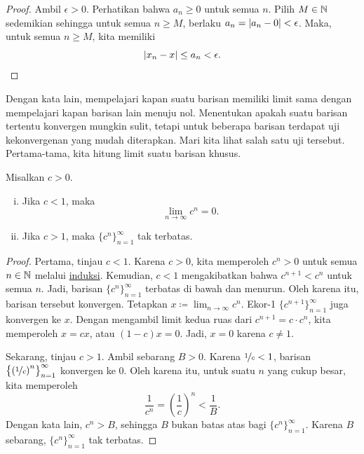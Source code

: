 \begin{proof}
Ambil $\epsilon > 0$.  Perhatikan bahwa $a_n \geq 0$
untuk semua $n$.  Pilih $M \in {\mathbb{N}}$ sedemikian sehingga untuk
semua $n \geq M$, berlaku
$a_n = \lvert {a_n - 0} \rvert < \epsilon$.  Maka, untuk semua $n \geq M$,
kita memiliki
\begin{equation*}
\lvert {x_n - x} \rvert \leq a_n < \epsilon . \qedhere
\end{equation*}
\end{proof}

Dengan kata lain, mempelajari kapan suatu barisan memiliki limit sama
dengan mempelajari kapan barisan lain menuju nol.
Menentukan apakah suatu barisan tertentu konvergen mungkin sulit, tetapi
untuk beberapa barisan terdapat uji kekonvergenan yang mudah diterapkan.
Mari kita lihat salah satu uji tersebut.
Pertama-tama, kita hitung limit suatu barisan khusus.

\begin{prop}
Misalkan $c > 0$.
\begin{enumerate}[(i)]
\item
Jika $c < 1$, maka
\begin{equation*}
\lim_{n\to\infty} c^n = 0.
\end{equation*}
\item
Jika $c > 1$, maka $\{ c^n \}_{n=1}^\infty$ tak terbatas.
\end{enumerate}
\end{prop}

\begin{proof}
Pertama, tinjau $c < 1$.  Karena $c > 0$, kita memperoleh $c^n > 0$ untuk semua $n \in {\mathbb{N}}$ melalui
\hyperref[induction:thm]{induksi}.  Kemudian, $c < 1$ mengakibatkan bahwa
$c^{n+1} < c^n$ untuk semua $n$.
Jadi, barisan $\{ c^n \}_{n=1}^\infty$
terbatas di bawah dan
menurun.  Oleh karena itu, barisan tersebut konvergen.
Tetapkan $x \coloneqq \lim_{n\to\infty} c^n$.  Ekor-1 $\{ c^{n+1} \}_{n=1}^\infty$
juga konvergen ke $x$.  Dengan mengambil limit kedua ruas dari $c^{n+1} = c \cdot
c^n$, kita memperoleh $x = cx$, atau $(1-c)x=0$.  Jadi, $x=0$ karena $c \neq 1$.

Sekarang, tinjau $c > 1$.
Ambil sebarang $B > 0$.
Karena $\nicefrac{1}{c} < 1$, barisan $\bigl\{ {(\nicefrac{1}{c})}^n \bigr\}_{n=1}^\infty$
konvergen ke $0$.
Oleh karena itu, untuk suatu $n$ yang cukup besar, kita memperoleh
\begin{equation*}
\frac{1}{c^n} =
{\left(\frac{1}{c}\right)}^n < \frac{1}{B} .
\end{equation*}
Dengan kata lain, $c^n > B$, sehingga $B$ bukan batas atas bagi
$\{ c^n \}_{n=1}^\infty$.  Karena $B$ sebarang, $\{ c^n \}_{n=1}^\infty$ tak terbatas.
\end{proof}

